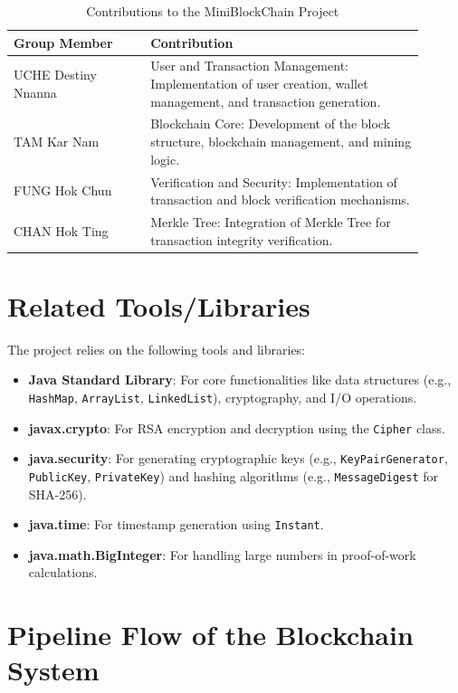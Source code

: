 \documentclass[12pt]{article}
\begin{document}
\begin{table}[h]
    \centering
    \caption{Contributions to the MiniBlockChain Project}
    \begin{tabular}{@{}p{0.3\linewidth}p{0.6\linewidth}@{}}
        \toprule
        \textbf{Group Member} & \textbf{Contribution} \\
        \midrule
        UCHE Destiny Nnanna & User and Transaction Management: Implementation of user creation, wallet management, and transaction generation. \\
        TAM Kar Nam & Blockchain Core: Development of the block structure, blockchain management, and mining logic. \\
        FUNG Hok Chun & Verification and Security: Implementation of transaction and block verification mechanisms. \\
        CHAN Hok Ting & Merkle Tree: Integration of Merkle Tree for transaction integrity verification. \\
        \bottomrule
    \end{tabular}
\end{table}



\section{Related Tools/Libraries}
The project relies on the following tools and libraries:
\begin{itemize}
    \item \textbf{Java Standard Library}: For core functionalities like data structures (e.g., \texttt{HashMap}, \texttt{ArrayList}, \texttt{LinkedList}), cryptography, and I/O operations.
    \item \textbf{javax.crypto}: For RSA encryption and decryption using the \texttt{Cipher} class.
    \item \textbf{java.security}: For generating cryptographic keys (e.g., \texttt{KeyPairGenerator}, \texttt{PublicKey}, \texttt{PrivateKey}) and hashing algorithms (e.g., \texttt{MessageDigest} for SHA-256).
    \item \textbf{java.time}: For timestamp generation using \texttt{Instant}.
    \item \textbf{java.math.BigInteger}: For handling large numbers in proof-of-work calculations.
\end{itemize}

\section{Pipeline Flow of the Blockchain System}
\end{document}
